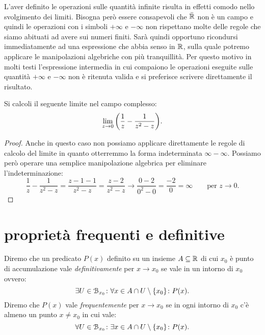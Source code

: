 L'aver definito le operazioni sulle quantità infinite
risulta in effetti comodo nello svolgimento dei limiti.
Bisogna però essere consapevoli che $\bar {{\mathbb R}}$ non è un campo
e quindi le operazioni con i simboli $+\infty$ e $-\infty$
non rispettano molte delle regole che siamo abituati
ad avere sui numeri finiti.
Sarà quindi opportuno ricondursi immediatamente ad una espressione
che abbia senso in ${\mathbb R}$, sulla quale potremo
applicare le manipolazioni algebriche con più tranquillità.
Per questo motivo in molti testi l'espressione intermedia in cui compaiono 
le operazioni eseguite sulle quantità $+\infty$ e $-\infty$ non è ritenuta valida
e si preferisce scrivere direttamente il risultato.
  
\begin{example}
Si calcoli il seguente limite nel campo complesso:
\[
\lim_{z\to 0} {\left( \frac 1 {z} - \frac 1 {z^2-z} \right)}. 
\]
\end{example}
\begin{proof}
  Anche in questo caso non possiamo applicare direttamente le regole 
  di calcolo del limite in quanto otterremmo la forma indeterminata 
  $\infty - \infty$.
  Possiamo però operare una semplice manipolazione algebrica
  per eliminare l'indeterminazione:
  \[
    \frac 1 {z} - \frac 1 {z^2-z}
    = \frac{z- 1 - 1}{z^2-z}
    = \frac{z-2}{z^2-z}
    \to \frac{0-2}{0^2-0} = \frac{-2}{0} = \infty 
    \qquad \text{per $z\to 0.$}
  \]
\end{proof}

\begin{comment} %
\begin{exercise}
  Calcolare 
  \[
  \lim_{x\to 0^+} x^x.
  \]
\end{exercise}

\begin{exercise}
  Trovare un esempio di funzioni $f(x)$ e $g(x)$ tali che 
  \[
     \lim_{x\to 0} f(x) = 0, \qquad 
     \lim_{x\to 0} g(x) = 0
  \]
  ma 
  \[
    \lim_{x\to 0} f(x)^{g(x)} \neq 1.
  \]
\end{exercise}
\end{comment}

\section{proprietà frequenti e definitive}

\begin{definition}
Diremo che un predicato $P(x)$ definito su un insieme $A\subseteq {\mathbb R}$ 
di cui $x_0$ è punto di accumulazione vale 
\emph{definitivamente}%
%
 per $x\to x_0$ se
vale in un intorno di $x_0$ ovvero:
\[
  \exists U\in \mathcal B_{x_0}\colon \forall x \in A\cap U\setminus{\left\{ x_0 \right\}}\colon P(x).
\]
Diremo che $P(x)$ vale \emph{frequentemente}%
%
 per $x\to x_0$
se in ogni intorno di $x_0$ c'è almeno un punto $x\neq x_0$ 
in cui vale:
\[
  \forall U\in \mathcal B_{x_0}\colon \exists x\in A\cap U\setminus{\left\{ x_0 \right\}}
  \colon P(x).
\]
\end{definition}

